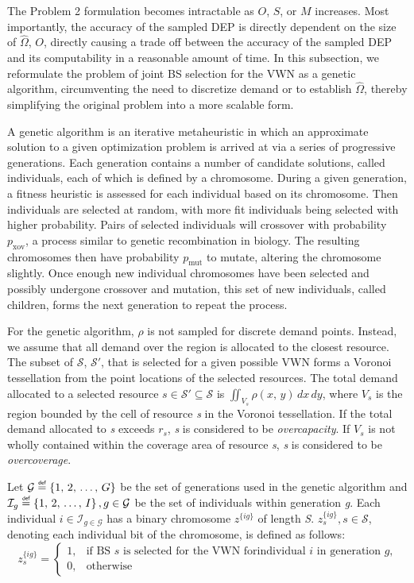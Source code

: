 \documentclass[12pt,dvipsnames]{report}
\newcommand\defeq{\mathrel{\overset{\makebox[0pt]{\mbox{\normalfont\tiny\sffamily def}}}{=}}}
\begin{document}
The Problem 2 formulation becomes intractable as $O$, $S$, or $M$ increases.  Most importantly, the accuracy of the sampled DEP is directly dependent on the size of $\hat{\Omega}$, $O$, directly causing a trade off between the accuracy of the sampled DEP and its computability in a reasonable amount of time.  In this subsection, we reformulate the problem of joint BS selection for the VWN as a genetic algorithm, circumventing the need to discretize demand or to establish $\hat{\Omega}$, thereby simplifying the original problem into a more scalable form.

A genetic algorithm is an iterative metaheuristic in which an approximate solution to a given optimization problem is arrived at via a series of progressive generations.  Each generation contains a number of candidate solutions, called individuals, each of which is defined by a chromosome.  During a given generation, a fitness heuristic is assessed for each individual based on its chromosome.  Then individuals are selected at random, with more fit individuals being selected with higher probability.  Pairs of selected individuals will crossover with probability $p_\text{xov}$, a process similar to genetic recombination in biology.  The resulting chromosomes then have probability $p_\text{mut}$ to mutate, altering the chromosome slightly.  Once enough new individual chromosomes have been selected and possibly undergone crossover and mutation, this set of new individuals, called children, forms the next generation to repeat the process.  %

For the genetic algorithm, $\rho$ is not sampled for discrete demand points.  Instead, we assume that all demand over the region is allocated to the closest resource.  The subset of $\mathcal{S}$, $\mathcal{S}'$, that is selected for a given possible VWN forms a Voronoi tessellation from the point locations of the selected resources.  The total demand allocated to a selected resource $s \in \mathcal{S}' \subseteq \mathcal{S}$ is $\iint_{V_s} \rho\left(x,\, y\right) \,dx \,dy$, where $V_s$ is the region bounded by the cell of resource \textit{s} in the Voronoi tessellation.  If the total demand allocated to \textit{s} exceeds $r_s$, \textit{s} is considered to be \textit{overcapacity}.  If $V_s$ is not wholly contained within the coverage area of resource \textit{s}, \textit{s} is considered to be \textit{overcoverage}.

Let $\mathcal{G} \defeq \left\{1,\, 2,\, \ldots,\, G\right\}$ be the set of generations used in the genetic algorithm and $\mathcal{I}_g \defeq \left\{1,\, 2,\, \ldots,\, I\right\}, g \in \mathcal{G}$ be the set of individuals within generation \textit{g}.  Each individual $i \in \mathcal{I}_{g \in \mathcal{G}}$ has a binary chromosome $z^{\{ig\}}$ of length \textit{S}.  $z_s^{\{ig\}}, s \in \mathcal{S}$, denoting each individual bit of the chromosome, is defined as follows:
\[ z_s^{\{ig\}} =
	\begin{cases}
		1,& \text{if BS $s$ is selected for the VWN for} \text{individual $i$ in generation $g$,}\\
		0,& \text{otherwise}
	\end{cases}
\]
\end{document}

